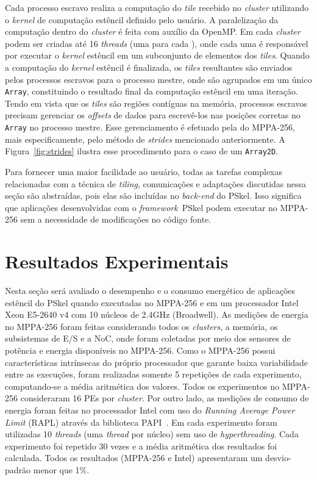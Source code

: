 \documentclass[12pt]{article}
\newcommand{\fw}{\textit{framework}\xspace}
\newcommand{\pskel}{PSkel\xspace}
\newcommand{\mppa}{MPPA-256\xspace}
\begin{document}
Cada processo escravo realiza a computação do \textit{tile} recebido no
\textit{cluster} utilizando o \textit{kernel} de computação estêncil definido
pelo usuário. A paralelização da computação dentro do \textit{cluster} é feita
com auxílio da \api OpenMP. Em cada \textit{cluster} podem ser criadas até 16
\textit{threads} (uma para cada \pe), onde cada uma é responsável por executar o
\textit{kernel} estêncil em um subconjunto de elementos dos \textit{tiles}.
Quando a computação do \textit{kernel} estêncil é finalizada, os \textit{tiles}
resultantes são enviados pelos processos escravos para o processo mestre, onde
são agrupados em um único \texttt{Array}, constituindo o resultado final da
computação estêncil em uma iteração. Tendo em vista que os \textit{tiles} são
regiões contíguas na memória, processos escravos precisam gerenciar os
\textit{offsets} de dados para escrevê-los nas posições corretas no
\texttt{Array} no processo mestre. Esse gerenciamento é efetuado pela \api do
\mppa, mais especificamente, pelo método de \textit{strides} mencionado
anteriormente. A Figura~\ref{fig:strides} ilustra esse procedimento para o caso
de um \texttt{Array2D}.

Para fornecer uma maior facilidade ao usuário, todas as tarefas complexas
relacionadas com a técnica de \textit{tiling}, comunicações \noc e adaptações
discutidas nessa seção são abstraídas, pois elas são incluídas no
\textit{back-end} do \pskel. Isso significa que aplicações desenvolvidas com o
\fw ~\pskel podem executar no \mppa sem a necessidade de modificações no código
fonte.

\section{Resultados Experimentais}
\label{sec:resultados}

Nesta seção será avaliado o desempenho e o consumo energético de aplicações
estêncil do \pskel quando executadas no \mppa e em um processador Intel Xeon
E5-2640 v4 com 10 núcleos de 2.4GHz (Broadwell). As medições de energia no \mppa
foram feitas considerando todos os \textit{clusters}, a memória, os subsistemas
de E/S e a NoC, onde foram coletadas por meio dos sensores de potência e energia
disponíveis no \mppa. Como o \mppa possui características intrínsecas do próprio
processador que garante baixa variabilidade entre as execuções, foram realizadas
somente 5 repetições de cada experimento, computando-se a média aritmética dos
valores. Todos os experimentos no \mppa consideraram 16 PEs por
\textit{cluster}. Por outro lado, as medições de consumo de energia foram feitas
no processador Intel com uso do \textit{Running Average Power Limit} (RAPL)
através da biblioteca PAPI~\cite{papi12}. Em cada experimento foram utilizadas
10 \textit{threads} (uma \textit{thread} por núcleo) sem uso de
\textit{hyperthreading}. Cada experimento foi repetido 30 vezes e a média
aritmética dos resultados foi calculada. Todos os resultados (\mppa e Intel)
apresentaram um desvio-padrão menor que 1$\%$.
\end{document}
